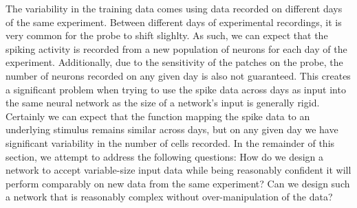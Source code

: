 \documentclass[12pt]{article}
\begin{document}
\indent The variability in the training data comes using data recorded on different days of the same experiment. Between different days of experimental recordings, it is very common for the probe to shift slighlty. As such, we can expect that the spiking activity is recorded from a new population of neurons for each day of the experiment. Additionally, due to the sensitivity of the patches on the probe, the number of neurons recorded on any given day is also not guaranteed. This creates a significant problem when trying to use the spike data across days as input into the same neural network as the size of a network's input is generally rigid. Certainly we can expect that the function mapping the spike data to an underlying stimulus remains similar across days, but on any given day we have significant variability in the number of cells recorded. In the remainder of this section, we attempt to address the following questions: How do we design a network to accept variable-size input data while being reasonably confident it will perform comparably on new data from the same experiment? Can we design such a network that is reasonably complex without over-manipulation of the data?
\end{document}
